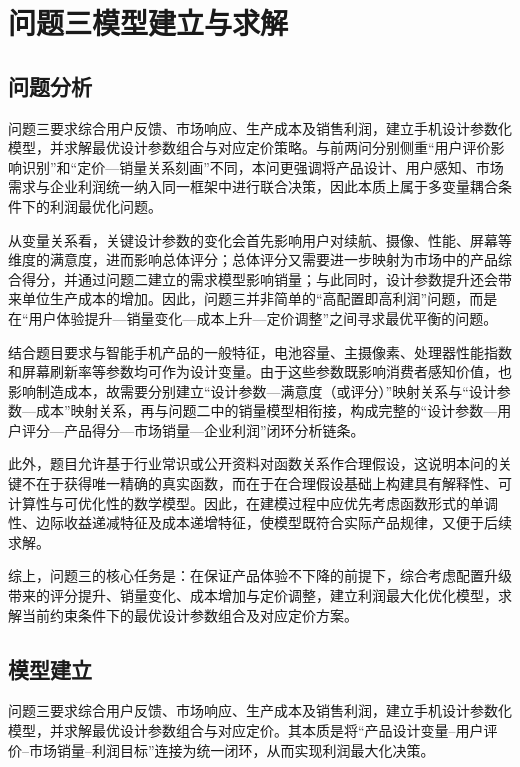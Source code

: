 \documentclass[withoutpreface,bwprint]{cumcmthesis} %
\begin{document}
 
\section{问题三模型建立与求解}

\subsection{问题分析}

问题三要求综合用户反馈、市场响应、生产成本及销售利润，建立手机设计参数化模型，并求解最优设计参数组合与对应定价策略。与前两问分别侧重“用户评价影响识别”和“定价—销量关系刻画”不同，本问更强调将产品设计、用户感知、市场需求与企业利润统一纳入同一框架中进行联合决策，因此本质上属于多变量耦合条件下的利润最优化问题。

从变量关系看，关键设计参数的变化会首先影响用户对续航、摄像、性能、屏幕等维度的满意度，进而影响总体评分；总体评分又需要进一步映射为市场中的产品综合得分，并通过问题二建立的需求模型影响销量；与此同时，设计参数提升还会带来单位生产成本的增加。因此，问题三并非简单的“高配置即高利润”问题，而是在“用户体验提升—销量变化—成本上升—定价调整”之间寻求最优平衡的问题。

结合题目要求与智能手机产品的一般特征，电池容量、主摄像素、处理器性能指数和屏幕刷新率等参数均可作为设计变量。由于这些参数既影响消费者感知价值，也影响制造成本，故需要分别建立“设计参数—满意度（或评分）”映射关系与“设计参数—成本”映射关系，再与问题二中的销量模型相衔接，构成完整的“设计参数—用户评分—产品得分—市场销量—企业利润”闭环分析链条。

此外，题目允许基于行业常识或公开资料对函数关系作合理假设，这说明本问的关键不在于获得唯一精确的真实函数，而在于在合理假设基础上构建具有解释性、可计算性与可优化性的数学模型。因此，在建模过程中应优先考虑函数形式的单调性、边际收益递减特征及成本递增特征，使模型既符合实际产品规律，又便于后续求解。

综上，问题三的核心任务是：在保证产品体验不下降的前提下，综合考虑配置升级带来的评分提升、销量变化、成本增加与定价调整，建立利润最大化优化模型，求解当前约束条件下的最优设计参数组合及对应定价方案。


\subsection{模型建立}

问题三要求综合用户反馈、市场响应、生产成本及销售利润，建立手机设计参数化模型，并求解最优设计参数组合与对应定价。其本质是将“产品设计变量--用户评价--市场销量--利润目标”连接为统一闭环，从而实现利润最大化决策。
\end{document}

